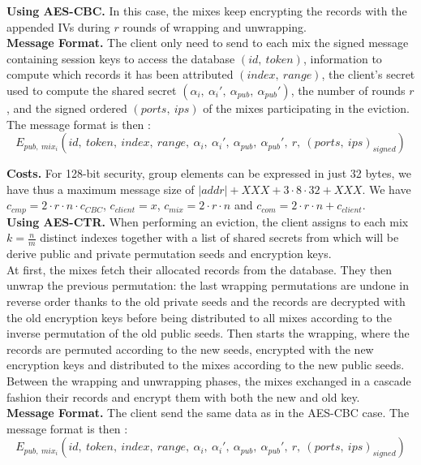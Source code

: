 \documentclass[USenglish,oneside,twocolumn]{article}
\begin{document}
\noindent\textbf{Using AES-CBC.} In this case, the mixes keep encrypting the records with the appended IVs during $r$ rounds of wrapping and unwrapping.\\

\noindent\textbf{Message Format.}
The client only need to send to each mix the signed message containing session keys to access the database $(id,\ token)$, information to compute which records it has been attributed $(index,\ range)$, the client's secret used to compute the shared secret $(\alpha_i,\ \alpha_i',\ \alpha_{pub},\ \alpha_{pub}')$, the number of rounds $r$, and the signed ordered $(ports,\ ips)$ of the mixes participating in the eviction.
The message format is then : $$E_{pub,\ mix_i}\left (id,\ token,\ index,\ range,\ \alpha_i,\ \alpha_i',\ \alpha_{pub},\ \alpha_{pub}',\ r,\ (port	s,\ ips)_{signed}\right )$$

\noindent\textbf{Costs.} For 128-bit security, group elements can be expressed in just 32 bytes, we have thus a maximum message size of $|addr|+XXX + 3 \cdot 8 \cdot 32 + XXX$. We have $c_{cmp} = 2\cdot r \cdot n \cdot c_{CBC}$, $c_{client}= x$, $c_{mix}= 2\cdot r \cdot n$ and $c_{com} = 2 \cdot r \cdot n+ c_{client}$.\\

\noindent\textbf{Using AES-CTR.}
When performing an eviction, the client assigns to each mix  $k=\frac{n}{m}$ distinct indexes together with a list of shared secrets from which will be derive public and private permutation seeds and encryption keys.\\
At first, the mixes fetch their allocated records from the database. They then unwrap the previous permutation: the last wrapping permutations are undone in reverse order thanks to the old private seeds and the records are decrypted with the old encryption keys before being distributed to all mixes according to the inverse permutation of the old public seeds. Then starts the wrapping, where the records are permuted according to the new seeds, encrypted with the new encryption keys and distributed to the mixes according to the new public seeds. Between the wrapping and unwrapping phases, the mixes exchanged in a cascade fashion their records and encrypt them with both the new and old key.\\

\noindent\textbf{Message Format.}
The client send the same data as in the AES-CBC case. The message format is then : $$E_{pub,\ mix_i}\left (id,\ token,\ index,\ range,\ \alpha_i,\ \alpha_i',\ \alpha_{pub},\ \alpha_{pub}',\ r,\ (ports,\ ips)_{signed}\right )$$
\end{document}
